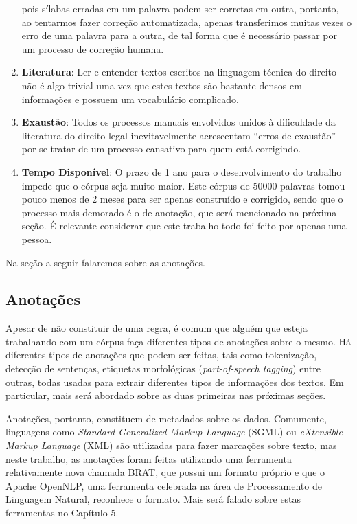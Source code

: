 \documentclass[11pt]{report}
\newcommand{\quotes}[1]{``#1''}
\begin{document}
\begin{enumerate}[label=\textbf{\arabic*.}]
  pois sílabas erradas em um palavra podem ser corretas em outra, portanto, ao tentarmos fazer correção automatizada, apenas transferimos muitas vezes o erro de uma palavra
  para a outra, de tal forma que é necessário passar por um processo de correção humana.
  \item \textbf{Literatura}: Ler e entender textos escritos na linguagem técnica do direito não é algo trivial uma vez que estes textos são bastante densos em informações e
  possuem um vocabulário complicado.
  \item \textbf{Exaustão}: Todos os processos manuais envolvidos unidos à dificuldade da literatura do direito legal inevitavelmente acrescentam \quotes{erros de exaustão}
  por se tratar de um processo cansativo para quem está corrigindo.
  \item \textbf{Tempo Disponível}: O prazo de 1 ano para o desenvolvimento do trabalho impede que o córpus seja muito maior. Este córpus de 50000 palavras tomou pouco menos de 2 meses
  para ser apenas construído e corrigido, sendo que o processo mais demorado é o de anotação, que será mencionado na próxima seção. É relevante considerar que este trabalho
  todo foi feito por apenas uma pessoa.
\end{enumerate}

Na seção a seguir falaremos sobre as anotações.

\subsection{Anotações}

\indent\indent Apesar de não constituir de uma regra, é comum que alguém que esteja trabalhando com um córpus faça diferentes tipos de anotações sobre o mesmo.
Há diferentes tipos de anotações que podem ser feitas, tais como tokenização, detecção de sentenças, etiquetas morfológicas (\textit{part-of-speech tagging}) entre outras, todas
usadas para extrair diferentes tipos de informações dos textos. Em particular, mais será abordado sobre as duas primeiras nas próximas seções.

Anotações, portanto, constituem de metadados sobre os dados. Comumente, linguagens como \textit{Standard Generalized Markup Language} (SGML) ou
\textit{eXtensible Markup Language} (XML) são utilizadas para fazer marcações sobre texto, mas
neste trabalho, as anotações foram feitas utilizando uma ferramenta relativamente nova chamada BRAT, que possui um
formato próprio e que o Apache OpenNLP, uma ferramenta celebrada na área de Processamento de Linguagem Natural, reconhece o formato.
Mais será falado sobre estas ferramentas no Capítulo 5.
\end{document}
